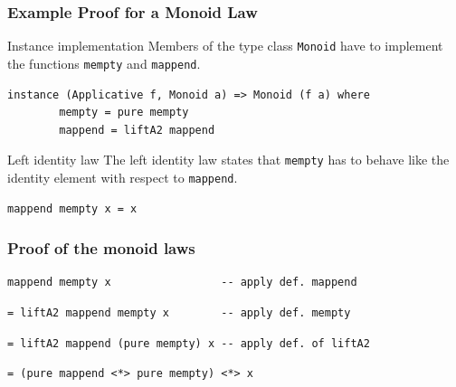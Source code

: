 \documentclass{beamer}
\begin{document}
\begin{frame}[fragile]
\frametitle{Example Proof for a Monoid Law}  
\begin{block}{Instance implementation}
Members of the type class \verb|Monoid| have to implement the functions \verb|mempty| and \verb|mappend|.
  \begin{Verbatim}[fontsize=\footnotesize]
    instance (Applicative f, Monoid a) => Monoid (f a) where
        mempty = pure mempty
        mappend = liftA2 mappend
  \end{Verbatim}
\end{block}
\begin{block}{Left identity law}
The left identity law states that \verb|mempty| has to behave like the identity element with respect to \verb|mappend|.
\begin{Verbatim}[fontsize=\footnotesize]
mappend mempty x = x
\end{Verbatim}  
\end{block}

\end{frame}

\begin{frame}[fragile]
  \frametitle{Proof of the monoid laws}
 \let\thefootnote\relax{}
\begin{verbatim}
mappend mempty x                 -- apply def. mappend
\end{verbatim}
\pause
\begin{verbatim}
= liftA2 mappend mempty x        -- apply def. mempty
\end{verbatim}
\pause
\begin{verbatim}
= liftA2 mappend (pure mempty) x -- apply def. of liftA2
\end{verbatim}
\pause
\begin{verbatim}
= (pure mappend <*> pure mempty) <*> x   
\end{verbatim}

\end{frame}
\end{document}

